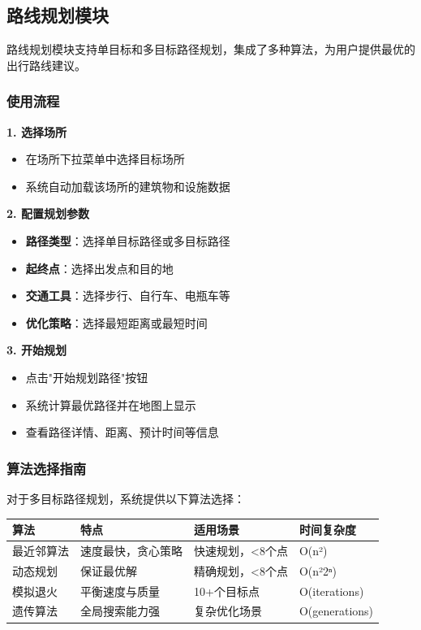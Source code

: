 \documentclass[12pt, a4paper]{article}
\begin{document}
\subsection{路线规划模块}

\begin{successbox}[title={智能路径规划}]
路线规划模块支持单目标和多目标路径规划，集成了多种算法，为用户提供最优的出行路线建议。
\end{successbox}

\subsubsection{使用流程}

\textbf{1. 选择场所}
\begin{itemize}
    \item 在场所下拉菜单中选择目标场所
    \item 系统自动加载该场所的建筑物和设施数据
\end{itemize}

\textbf{2. 配置规划参数}
\begin{itemize}
    \item \textbf{路径类型}：选择单目标路径或多目标路径
    \item \textbf{起终点}：选择出发点和目的地
    \item \textbf{交通工具}：选择步行、自行车、电瓶车等
    \item \textbf{优化策略}：选择最短距离或最短时间
\end{itemize}

\textbf{3. 开始规划}
\begin{itemize}
    \item 点击"开始规划路径"按钮
    \item 系统计算最优路径并在地图上显示
    \item 查看路径详情、距离、预计时间等信息
\end{itemize}

\subsubsection{算法选择指南}

对于多目标路径规划，系统提供以下算法选择：

\begin{table}[H]
\centering
\begin{tabular}{lp{4cm}p{3cm}l}
\toprule
\rowcolor{secondary!20}
\textbf{算法} & \textbf{特点} & \textbf{适用场景} & \textbf{时间复杂度} \\
\midrule
最近邻算法 & 速度最快，贪心策略 & 快速规划，<8个点 & O(n²) \\
\rowcolor{light}
动态规划 & 保证最优解 & 精确规划，<8个点 & O(n²2ⁿ) \\
模拟退火 & 平衡速度与质量 & 10+个目标点 & O(iterations) \\
\rowcolor{light}
遗传算法 & 全局搜索能力强 & 复杂优化场景 & O(generations) \\
\bottomrule
\end{tabular}
\end{table}
\end{document}

